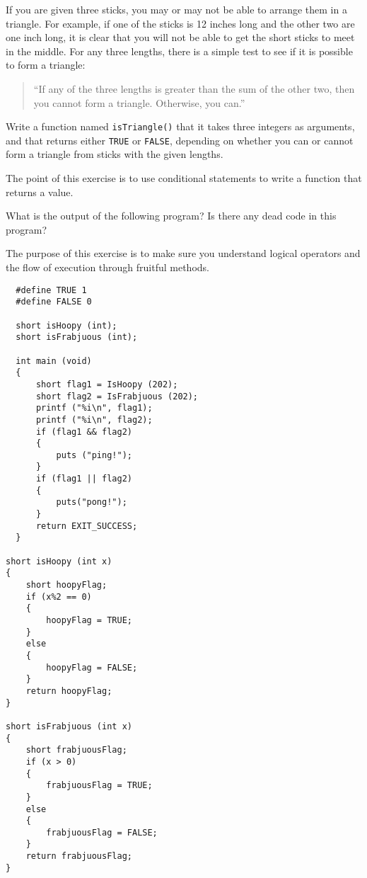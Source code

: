 

\begin{exercise}
If you are given three sticks, you may or may not be able to arrange
them in a triangle.  For example, if one of the sticks is 12 inches
long and the other two are one inch long, it is clear that you will
not be able to get the short sticks to meet in the middle.  For any
three lengths, there is a simple test to see if it is possible to form
a triangle:

\begin{quotation}
``If any of the three lengths is greater than the sum of the other two,
then you cannot form a triangle.  Otherwise, you can.''
\end{quotation}

Write a function named {\tt isTriangle()} that it takes three integers as
arguments, and that returns either {\tt TRUE} or {\tt FALSE},
depending on whether you can or cannot form a triangle from sticks
with the given lengths.


The point of this exercise is to use conditional statements to
write a function that returns a value.
\end{exercise}





\begin{exercise}
What is the output of the following program?  Is there any dead code in this program?

The purpose of this exercise is to make sure you understand logical operators and the flow of execution through fruitful methods.

\begin{verbatim}
  #define TRUE 1
  #define FALSE 0

  short isHoopy (int);
  short isFrabjuous (int);

  int main (void) 
  {
      short flag1 = IsHoopy (202);
      short flag2 = IsFrabjuous (202);
      printf ("%i\n", flag1);
      printf ("%i\n", flag2);
      if (flag1 && flag2) 
      {
          puts ("ping!");
      }
      if (flag1 || flag2) 
      {
          puts("pong!");
      }
      return EXIT_SUCCESS;
  }

short isHoopy (int x)
{
	short hoopyFlag;
	if (x%2 == 0) 
	{
		hoopyFlag = TRUE;
	} 
	else 
	{
		hoopyFlag = FALSE;
	}
	return hoopyFlag;
}

short isFrabjuous (int x) 
{
	short frabjuousFlag;
	if (x > 0) 
	{
		frabjuousFlag = TRUE;
	}
	else 
	{
		frabjuousFlag = FALSE;
	}
	return frabjuousFlag;
}

  
\end{verbatim}
\end{exercise}



